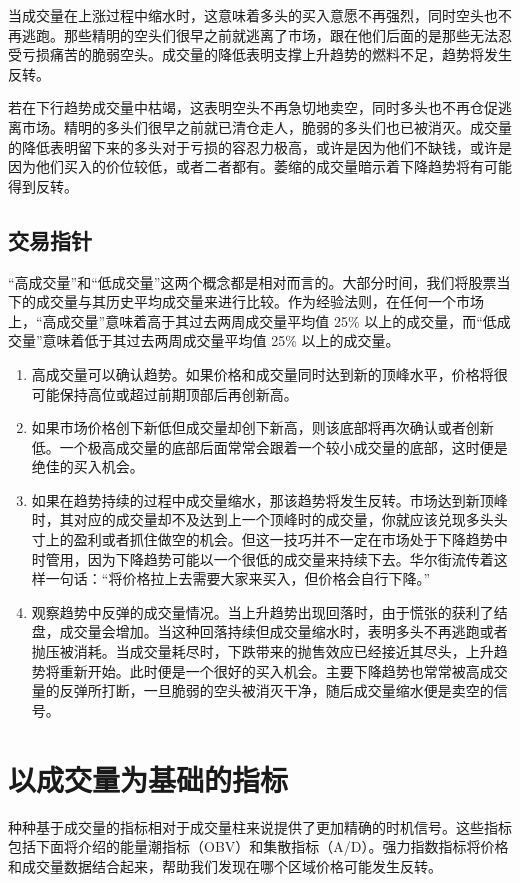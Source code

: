 当成交量在上涨过程中缩水时，这意味着多头的买入意愿不再强烈，同时空头也不再逃跑。那些精明的空头们很早之前就逃离了市场，跟在他们后面的是那些无法忍受亏损痛苦的脆弱空头。成交量的降低表明支撑上升趋势的燃料不足，趋势将发生反转。

若在下行趋势成交量中枯竭，这表明空头不再急切地卖空，同时多头也不再仓促逃离市场。精明的多头们很早之前就已清仓走人，脆弱的多头们也已被消灭。成交量的降低表明留下来的多头对于亏损的容忍力极高，或许是因为他们不缺钱，或许是因为他们买入的价位较低，或者二者都有。萎缩的成交量暗示着下降趋势将有可能得到反转。

\subsection*{交易指针}
“高成交量”和“低成交量”这两个概念都是相对而言的。大部分时间，我们将股票当下的成交量与其历史平均成交量来进行比较。作为经验法则，在任何一个市场上，“高成交量”意味着高于其过去两周成交量平均值 25\% 以上的成交量，而“低成交量”意味着低于其过去两周成交量平均值 25\% 以上的成交量。
\begin{enumerate}
    \item 高成交量可以确认趋势。如果价格和成交量同时达到新的顶峰水平，价格将很可能保持高位或超过前期顶部后再创新高。
    \item 如果市场价格创下新低但成交量却创下新高，则该底部将再次确认或者创新低。一个极高成交量的底部后面常常会跟着一个较小成交量的底部，这时便是绝佳的买入机会。
    \item 如果在趋势持续的过程中成交量缩水，那该趋势将发生反转。市场达到新顶峰时，其对应的成交量却不及达到上一个顶峰时的成交量，你就应该兑现多头头寸上的盈利或者抓住做空的机会。但这一技巧并不一定在市场处于下降趋势中时管用，因为下降趋势可能以一个很低的成交量来持续下去。华尔街流传着这样一句话：“将价格拉上去需要大家来买入，但价格会自行下降。”
    \item 观察趋势中反弹的成交量情况。当上升趋势出现回落时，由于慌张的获利了结盘，成交量会增加。当这种回落持续但成交量缩水时，表明多头不再逃跑或者抛压被消耗。当成交量耗尽时，下跌带来的抛售效应已经接近其尽头，上升趋势将重新开始。此时便是一个很好的买入机会。主要下降趋势也常常被高成交量的反弹所打断，一旦脆弱的空头被消灭干净，随后成交量缩水便是卖空的信号。
\end{enumerate}
\section{以成交量为基础的指标}
种种基于成交量的指标相对于成交量柱来说提供了更加精确的时机信号。这些指标包括下面将介绍的能量潮指标（OBV）和集散指标（A/D）。强力指数指标将价格和成交量数据结合起来，帮助我们发现在哪个区域价格可能发生反转。
